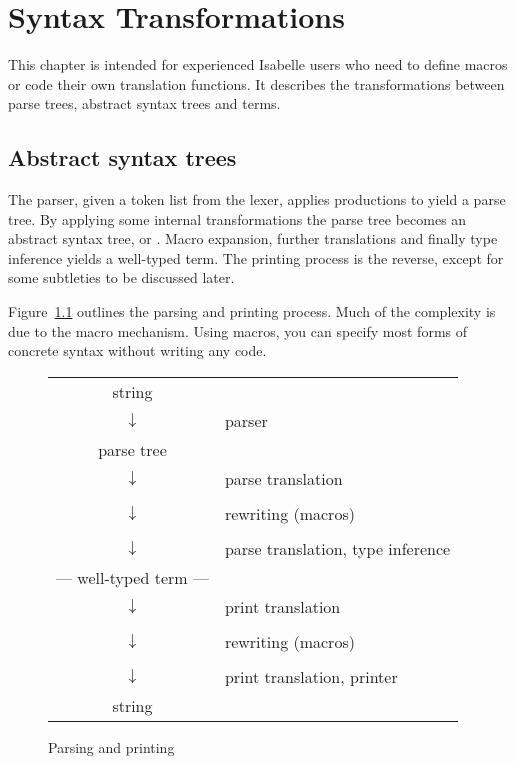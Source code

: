 \chapter{Syntax Transformations} \label{chap:syntax}
\newcommand\ttapp{\mathrel{\hbox{\tt\$}}}
\newcommand\mtt[1]{\mbox{\tt #1}}
\newcommand\ttfct[1]{\mathop{\mtt{#1}}\nolimits}
\newcommand\Constant{\ttfct{Constant}}
\newcommand\Variable{\ttfct{Variable}}
\newcommand\Appl[1]{\ttfct{Appl}\,[#1]}

This chapter is intended for experienced Isabelle users who need to define
macros or code their own translation functions.  It describes the
transformations between parse trees, abstract syntax trees and terms.


\section{Abstract syntax trees} \label{sec:asts}

The parser, given a token list from the lexer, applies productions to yield
a parse tree.  By applying some internal transformations
the parse tree becomes an abstract syntax tree, or \AST{}.  Macro
expansion, further translations and finally type inference yields a
well-typed term.  The printing process is the reverse, except for some
subtleties to be discussed later.

Figure~\ref{fig:parse_print} outlines the parsing and printing process.
Much of the complexity is due to the macro mechanism.  Using macros, you
can specify most forms of concrete syntax without writing any \ML{} code.

\begin{figure}
\begin{center}
\begin{tabular}{cl}
string          & \\
$\downarrow$    & parser \\
parse tree      & \\
$\downarrow$    & parse \AST{} translation \\
\AST{}             & \\
$\downarrow$    & \AST{} rewriting (macros) \\
\AST{}             & \\
$\downarrow$    & parse translation, type inference \\
--- well-typed term --- & \\
$\downarrow$    & print translation \\
\AST{}             & \\
$\downarrow$    & \AST{} rewriting (macros) \\
\AST{}             & \\
$\downarrow$    & print \AST{} translation, printer \\
string          &
\end{tabular}

\end{center}
\caption{Parsing and printing}\label{fig:parse_print}
\end{figure}

